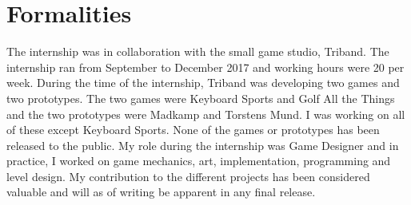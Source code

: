 \section{Formalities}
The internship was in collaboration with the small game studio, Triband. The internship ran from September to December 2017 and working hours were 20 per week. During the time of the internship, Triband was developing two games and two prototypes. The two games were Keyboard Sports and Golf All the Things and the two prototypes were Madkamp and Torstens Mund. I was working on all of these except Keyboard Sports. None of the games or prototypes has been released to the public. My role during the internship was Game Designer and in practice, I worked on game mechanics, art, implementation, programming and level design. My contribution to the different projects has been considered valuable and will as of writing be apparent in any final release.
